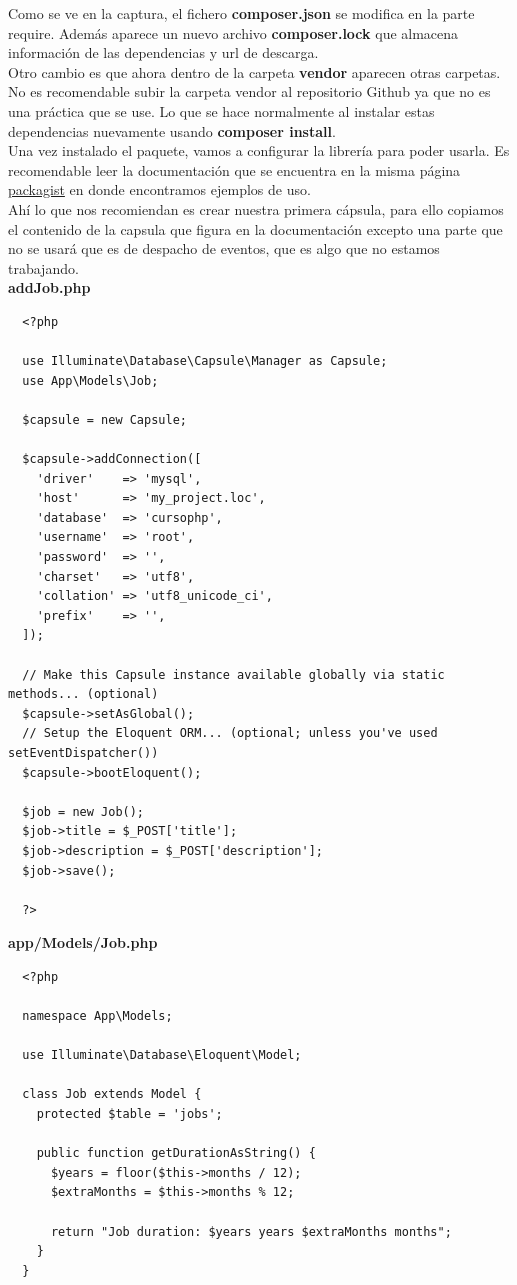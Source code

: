 \documentclass{article}
\begin{document}
Como se ve en la captura, el fichero \textbf{composer.json} se modifica en la
parte require. Además aparece un nuevo archivo \textbf{composer.lock} que
almacena información de las dependencias y url de descarga.\\

Otro cambio es que ahora dentro de la carpeta \textbf{vendor} aparecen otras
carpetas. No es recomendable subir la carpeta vendor al repositorio Github ya
que no es una práctica que se use. Lo que se hace normalmente al instalar estas
dependencias nuevamente usando \textbf{composer install}.\\

Una vez instalado el paquete, vamos a configurar la librería para poder usarla.
Es recomendable leer la documentación que se encuentra en la misma página
\href{https://packagist.org/packages/illuminate/database}{packagist} en donde
encontramos ejemplos de uso.\\

Ahí lo que nos recomiendan es crear nuestra primera cápsula, para ello copiamos
el contenido de la capsula que figura en la documentación excepto una parte que
no se usará que es de despacho de eventos, que es algo que no estamos
trabajando.\\

\textbf{addJob.php}
\begin{verbatim}
  <?php

  use Illuminate\Database\Capsule\Manager as Capsule;
  use App\Models\Job;

  $capsule = new Capsule;

  $capsule->addConnection([
    'driver'    => 'mysql',
    'host'      => 'my_project.loc',
    'database'  => 'cursophp',
    'username'  => 'root',
    'password'  => '',
    'charset'   => 'utf8',
    'collation' => 'utf8_unicode_ci',
    'prefix'    => '',
  ]);

  // Make this Capsule instance available globally via static methods... (optional)
  $capsule->setAsGlobal();
  // Setup the Eloquent ORM... (optional; unless you've used setEventDispatcher())
  $capsule->bootEloquent();

  $job = new Job();
  $job->title = $_POST['title'];
  $job->description = $_POST['description'];
  $job->save();

  ?>
\end{verbatim}

\newpage

\textbf{app/Models/Job.php}
\begin{verbatim}
  <?php

  namespace App\Models;

  use Illuminate\Database\Eloquent\Model;

  class Job extends Model {
    protected $table = 'jobs';

    public function getDurationAsString() {
      $years = floor($this->months / 12);
      $extraMonths = $this->months % 12;

      return "Job duration: $years years $extraMonths months";
    }
  }
\end{verbatim}
\end{document}
